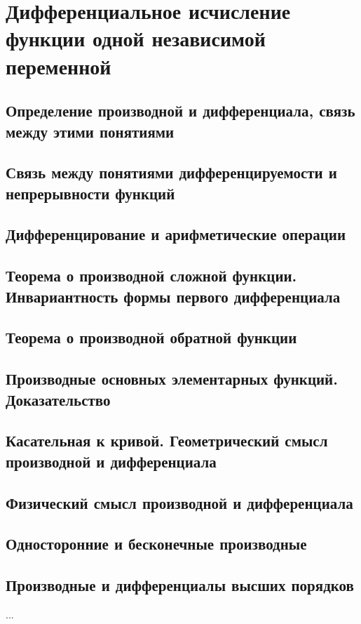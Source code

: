 \section{Дифференциальное исчисление функции одной независимой переменной}
\subsection{Определение производной и дифференциала, связь между этими понятиями}

\subsection{Связь между понятиями дифференцируемости и непрерывности функций}

\subsection{Дифференцирование и арифметические операции}
\subsection{Теорема о производной сложной функции. Инвариантность формы первого дифференциала}
\subsection{Теорема о производной обратной функции}
\subsection{Производные основных элементарных функций. Доказательство}
\subsection{Касательная к кривой. Геометрический смысл производной и дифференциала}
\subsection{Физический смысл производной и дифференциала}
\subsection{Односторонние и бесконечные производные}
\subsection{Производные и дифференциалы высших порядков}
...

